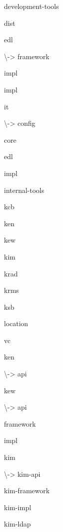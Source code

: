 \documentclass[12pt,notitlepage]{article}
\begin{document}
{\begin{list}{|->}{\setlength{\leftmargin}{1em}}
\begin{list}{|->}{\setlength{\leftmargin}{1em}}
  \item development-tools
  \item dist
  \item edl
    \begin{list}{|->}{\setlength{\leftmargin}{0.5em}}
    \item[\textbackslash->] framework
      \item impl
    \end{list}
  \item impl
  \item it
    \begin{list}{|->}{\setlength{\leftmargin}{0.5em}}
    \item[\textbackslash->] config
      \item core
      \item edl
      \item impl
      \item internal-tools
      \item kcb
      \item ken
      \item kew
      \item kim
      \item krad
      \item krms
      \item ksb
      \item location
      \item vc
    \end{list}
  \item ken
    \begin{list}{|->}{\setlength{\leftmargin}{0.5em}}
    \item[\textbackslash->] api
    \end{list}
  \item kew
    \begin{list}{|->}{\setlength{\leftmargin}{0.5em}}
    \item[\textbackslash->] api
      \item framework
      \item impl
    \end{list}
  \item kim
    \begin{list}{|->}{\setlength{\leftmargin}{0.5em}}
    \item[\textbackslash->] kim-api
    \item kim-framework
    \item kim-impl
    \item kim-ldap
    \end{list} 

\end{list}
\end{list}}
\end{document}
